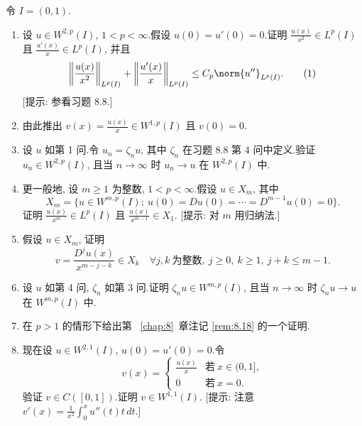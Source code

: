 \begin{exercise}
\label{exer:8.9}
令 $I=(0,1)$.
\begin{enumerate}[label=\arabic*., leftmargin=2.2em, itemsep=0.3em]
	\item 设 $u\in W^{2,p}(I)$, $1<p<\infty$.假设 $u(0)=u'(0)=0$.证明
	      $\frac{u(x)}{x^2}\in L^p(I)$ 且 $\frac{u'(x)}{x}\in L^p(I)$,
	      并且
	      \begin{equation}
	      \left\|\frac{u(x)}{x^2}\right\|_{L^p(I)}
	      +\left\|\frac{u'(x)}{x}\right\|_{L^p(I)}
	      \le C_p\norm{u''}_{L^p(I)}.
	      \tag{1}
	      \end{equation}
	      [提示: 参看习题 8.8.]
	\item 由此推出 $v(x)=\frac{u(x)}{x}\in W^{1,p}(I)$ 且 $v(0)=0$.
	\item 设 $u$ 如第 1 问.令 $u_n=\zeta_nu$, 其中 $\zeta_n$ 在习题 8.8
	      第 4 问中定义.验证 $u_n\in W^{2,p}(I)$, 且当 $n\to\infty$ 时
	      $u_n\to u$ 在 $W^{2,p}(I)$ 中.
	\item 更一般地, 设 $m\ge1$ 为整数, $1<p<\infty$.假设 $u\in X_m$, 其中
	      \begin{equation*}
	      X_m=\{u\in W^{m,p}(I);\ u(0)=Du(0)=\cdots=D^{m-1}u(0)=0\}.
	      \end{equation*}
	      证明 $\frac{u(x)}{x^m}\in L^p(I)$ 且 $\frac{u(x)}{x^{m-1}}\in X_1$.
	      [提示: 对 $m$ 用归纳法.]
	\item 假设 $u\in X_m$, 证明
	      \begin{equation*}
	      v=\frac{D^ju(x)}{x^{m-j-k}}\in X_k
	      \quad\forall j,k\ \text{为整数},\ j\ge0,\ k\ge1,\ j+k\le m-1.
	      \end{equation*}
	\item 设 $u$ 如第 4 问, $\zeta_n$ 如第 3 问.证明
	      $\zeta_nu\in W^{m,p}(I)$, 且当 $n\to\infty$ 时
	      $\zeta_nu\to u$ 在 $W^{m,p}(I)$ 中.
	\item 在 $p>1$ 的情形下给出第~
\ref{chap:8}~章注记 \ref{rem:8.18} 的一个证明.
	\item 现在设 $u\in W^{2,1}(I)$, $u(0)=u'(0)=0$.令
	      \begin{equation*}
	      v(x)=
	      \begin{cases}
	      \frac{u(x)}{x} & \text{若}\ x\in(0,1],\\
	      0 & \text{若}\ x=0.
	      \end{cases}
	      \end{equation*}
	      验证 $v\in C([0,1])$.证明 $v\in W^{1,1}(I)$.
	      [提示: 注意
	      $v'(x)=\frac{1}{x^2}\int_0^xu''(t)t\,dt$.]

\end{enumerate}
\end{exercise}
